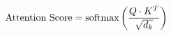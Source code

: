 \documentclass[preview]{standalone}
\begin{document}
\begin{align*}
\special{dvisvgm:raw <g id='unique000'>}\text{Attention Score} = \text{softmax}\left(\frac{Q \cdot K^T}{\sqrt{d_k}}\right)\special{dvisvgm:raw </g>}
\end{align*}
\end{document}
